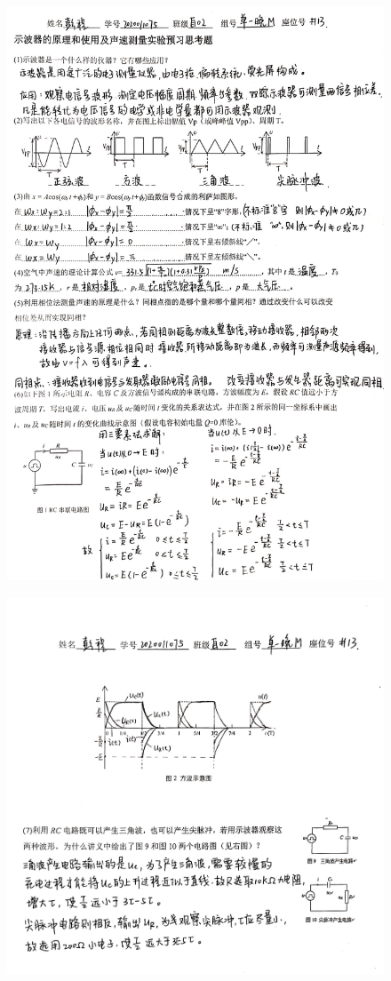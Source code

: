 \documentclass[UTF8]{ctexart}
\begin{document}
\begin{figure}[h]
    \centering
    \includegraphics[scale=0.3]{预习1.jpg}
\end{figure}
\begin{figure}[t]
    \centering
    \includegraphics[scale=0.3]{预习2.jpg}
\end{figure}
\end{document}
